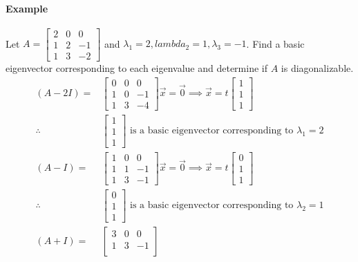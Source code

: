 \paragraph*{Example}
Let $A = \begin{bmatrix}
    2 & 0 & 0 \\
    1 & 2 & -1 \\
    1 & 3 & -2
\end{bmatrix}$ and $\lambda_1 = 2, lambda_2 = 1, \lambda_3 = -1$. Find a basic eigenvector corresponding to each eigenvalue and determine if $A$ is diagonalizable.
\begin{align*}
    (A - 2I) = &\begin{bmatrix}
    0 & 0 & 0 \\
    1 & 0 & -1 \\
    1 & 3 & -4
    \end{bmatrix} \vec{x} = \vec{0} \implies \vec{x} = t \begin{bmatrix}
    1 \\
    1 \\
    1
    \end{bmatrix} \\
    \therefore \quad &\begin{bmatrix}
    1 \\
    1 \\
    1
    \end{bmatrix} \text{ is a basic eigenvector corresponding to } \lambda_1 = 2 \\
    (A - I) = &\begin{bmatrix}
    1 & 0 & 0 \\
    1 & 1 & -1 \\
    1 & 3 & -1
    \end{bmatrix} \vec{x} = \vec{0} \implies \vec{x} = t \begin{bmatrix}
    0 \\
    1 \\
    1
    \end{bmatrix} \\
    \therefore \quad &\begin{bmatrix}
    0 \\
    1 \\
    1 
    \end{bmatrix} \text{ is a basic eigenvector corresponding to } \lambda_2 = 1 \\
    (A + I) = &\begin{bmatrix}
    3 & 0 & 0 \\
    1 & 3 & -1 \\

\end{bmatrix}
\end{align*}
